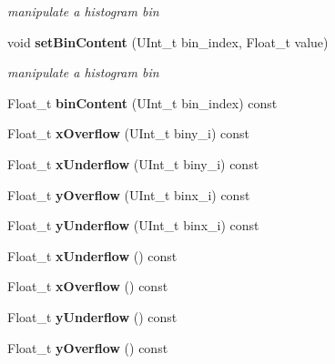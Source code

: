 \begin{DoxyCompactItemize}
\begin{DoxyCompactList}\small\item\em manipulate a histogram bin \item\end{DoxyCompactList}\item 
void {\bf setBinContent} (UInt\_\-t bin\_\-index, Float\_\-t value)\label{classhistmgr_1_1FloatHistogram2D_ae32ecb4a2dbe9af82e2d9deae0c27ae9}

\begin{DoxyCompactList}\small\item\em manipulate a histogram bin \item\end{DoxyCompactList}\item 
Float\_\-t {\bfseries binContent} (UInt\_\-t bin\_\-index) const \label{classhistmgr_1_1FloatHistogram2D_a49f9dd18dc961e95f62911da156bbc9e}

\item 
Float\_\-t {\bfseries xOverflow} (UInt\_\-t biny\_\-i) const \label{classhistmgr_1_1FloatHistogram2D_a84ee60b090e66f1a1839f73543284ad2}

\item 
Float\_\-t {\bfseries xUnderflow} (UInt\_\-t biny\_\-i) const \label{classhistmgr_1_1FloatHistogram2D_abc8e206e2cac237b73663320202bb573}

\item 
Float\_\-t {\bfseries yOverflow} (UInt\_\-t binx\_\-i) const \label{classhistmgr_1_1FloatHistogram2D_ab3951011e9cf17698a7b3cc5c766446f}

\item 
Float\_\-t {\bfseries yUnderflow} (UInt\_\-t binx\_\-i) const \label{classhistmgr_1_1FloatHistogram2D_aa2267579329064792b162fe320881d42}

\item 
Float\_\-t {\bfseries xUnderflow} () const \label{classhistmgr_1_1FloatHistogram2D_a756024a8658045e2157123e7c4cb3889}

\item 
Float\_\-t {\bfseries xOverflow} () const \label{classhistmgr_1_1FloatHistogram2D_aa0f77dee0d0554a892ef241ade373e07}

\item 
Float\_\-t {\bfseries yUnderflow} () const \label{classhistmgr_1_1FloatHistogram2D_a9615ca79f363ce43a4283a57b2f93bb9}

\item 
Float\_\-t {\bfseries yOverflow} () const \label{classhistmgr_1_1FloatHistogram2D_af1610406b9e3914576f3643158237dfa}


\end{DoxyCompactItemize}
